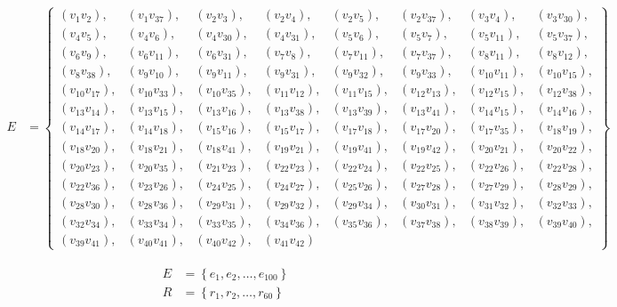 \begin{align*}
	E &= \left\lbrace 
	\begin{array}{llllllll}
		(v_1v_2), & (v_1v_{37}), & (v_2v_3), & (v_2v_4), & (v_2v_5), & (v_2v_{37}), & (v_3v_4), & (v_3v_{30}),\\
		(v_4v_5), & (v_4v_6), & (v_4v_{30}), & (v_4v_{31}), & (v_5v_6), & (v_5v_7), & (v_5v_{11}), & (v_5v_{37}),\\
		(v_6v_9), & (v_6v_{11}), & (v_6v_{31}), & (v_7v_8), & (v_7v_{11}), & (v_7v_{37}), & (v_8v_{11}), & (v_8v_{12}),\\
		(v_8v_{38}), & (v_9v_{10}), & (v_9v_{11}), & (v_9v_{31}), & (v_9v_{32}), & (v_9v_{33}), & (v_{10}v_{11}), & (v_{10}v_{15}),\\
		(v_{10}v_{17}), & (v_{10}v_{33}), & (v_{10}v_{35}), & (v_{11}v_{12}), & (v_{11}v_{15}), & (v_{12}v_{13}), & (v_{12}v_{15}), & (v_{12}v_{38}),\\
		(v_{13}v_{14}), & (v_{13}v_{15}), & (v_{13}v_{16}), & (v_{13}v_{38}), & (v_{13}v_{39}), & (v_{13}v_{41}), & (v_{14}v_{15}), & (v_{14}v_{16}),\\
		(v_{14}v_{17}), & (v_{14}v_{18}), & (v_{15}v_{16}), & (v_{15}v_{17}), & (v_{17}v_{18}), & (v_{17}v_{20}), & (v_{17}v_{35}), & (v_{18}v_{19}),\\
		(v_{18}v_{20}), & (v_{18}v_{21}), & (v_{18}v_{41}), & (v_{19}v_{21}), & (v_{19}v_{41}), & (v_{19}v_{42}), & (v_{20}v_{21}), & (v_{20}v_{22}),\\
		(v_{20}v_{23}), & (v_{20}v_{35}), & (v_{21}v_{23}), & (v_{22}v_{23}), & (v_{22}v_{24}), & (v_{22}v_{25}), & (v_{22}v_{26}), & (v_{22}v_{28}),\\
		(v_{22}v_{36}), & (v_{23}v_{26}), & (v_{24}v_{25}), & (v_{24}v_{27}), & (v_{25}v_{26}), & (v_{27}v_{28}), & (v_{27}v_{29}), & (v_{28}v_{29}),\\
		(v_{28}v_{30}), & (v_{28}v_{36}), & (v_{29}v_{31}), & (v_{29}v_{32}), & (v_{29}v_{34}), & (v_{30}v_{31}), & (v_{31}v_{32}), & (v_{32}v_{33}),\\
		(v_{32}v_{34}), & (v_{33}v_{34}), & (v_{33}v_{35}), & (v_{34}v_{36}), & (v_{35}v_{36}), & (v_{37}v_{38}), & (v_{38}v_{39}), & (v_{39}v_{40}),\\
		(v_{39}v_{41}), & (v_{40}v_{41}), & (v_{40}v_{42}), & (v_{41}v_{42})
	\end{array}
	\right\rbrace
\end{align*}

\begin{align*}
	E &= \left\lbrace e_1, e_2, \dots, e_{100} \right\rbrace\\
	R &= \left\lbrace r_1, r_2, \dots, r_{60} \right\rbrace
\end{align*}


